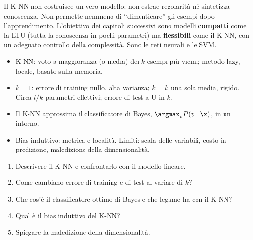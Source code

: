 \begin{idea}
Il K-NN non costruisce un vero modello: non estrae regolarità né sintetizza conoscenza. Non permette nemmeno di
``dimenticare'' gli esempi dopo l'apprendimento. L'obiettivo dei capitoli successivi sono modelli
\textbf{compatti} come la LTU (tutta la conoscenza in pochi parametri) ma \textbf{flessibili} come il K-NN, con
un adeguato controllo della complessità. Sono le reti neurali e le SVM.
\end{idea}

\begin{puntichiave}
\begin{itemize}
  \item K-NN: voto a maggioranza (o media) dei $k$ esempi più vicini; metodo lazy, locale, basato sulla memoria.
  \item $k=1$: errore di training nullo, alta varianza; $k=l$: una sola media, rigido. Circa $l/k$ parametri
        effettivi; errore di test a U in $k$.
  \item Il K-NN approssima il classificatore di Bayes, $\argmax_vP(v\mid\x)$, in un intorno.
  \item Bias induttivo: metrica e località. Limiti: scala delle variabili, costo in predizione, maledizione della
        dimensionalità.
\end{itemize}
\end{puntichiave}

\begin{domande}
\begin{enumerate}
  \item Descrivere il K-NN e confrontarlo con il modello lineare.
  \item Come cambiano errore di training e di test al variare di $k$?
  \item Che cos'è il classificatore ottimo di Bayes e che legame ha con il K-NN?
  \item Qual è il bias induttivo del K-NN?
  \item Spiegare la maledizione della dimensionalità.
\end{enumerate}
\end{domande}
